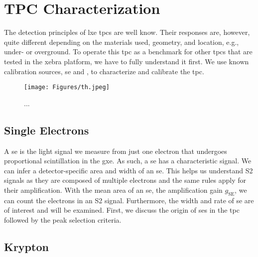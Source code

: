 \FloatBarrier
\chapter{TPC Characterization}
\label{chap:Analysis}
\FloatBarrier

The detection principles of \gls{lxe} \glspl{tpc} are well know.
Their responses are, however, quite different depending on the materials used, geometry, and location, e.g., under- or overground.
To operate this \gls{tpc} as a benchmark for other \glspl{tpc} that are tested in the \gls{xebra} platform, we have to fully understand it first.
We use known calibration sources, \gls{se} and , to characterize and calibrate the \gls{tpc}.


\begin{figure}
    \centering
    \texttt{[image: Figures/th.jpeg]}  %
    \caption[Single Electron Rate in 1T/100/LUX]{
        ...
    }
    \label{fig:se-rate-xe100}
\end{figure}


\FloatBarrier
\section{Single Electrons}
\label{sec:SE}
\FloatBarrier

A \gls{se} is the light signal we measure from just one electron that undergoes proportional scintillation in the \gls{gxe}.
As such, a \gls{se} has a characteristic signal.
We can infer a detector-specific area and width of an \gls{se}.
This helps us understand S2 signals as they are composed of multiple electrons and the same rules apply for their amplification.
With the mean area of an \gls{se}, the amplification gain $ g_\mathrm{SE} $, we can count the electrons in an S2 signal.
Furthermore, the width and rate of \gls{se} are of interest and will be examined.
First, we discuss the origin of \glspl{se} in the \gls{tpc} followed by the peak selection criteria.



\newpage

\newpage

\newpage

\newpage
% 
\newpage

\FloatBarrier
\section{Krypton}
\label{sec:Kr}
\FloatBarrier


